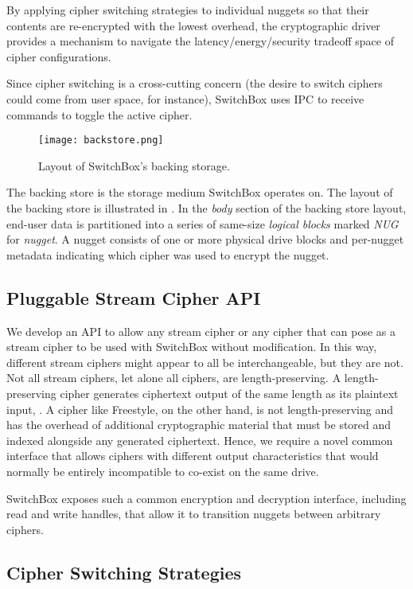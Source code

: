 By applying cipher switching strategies to individual nuggets so that their
contents are re-encrypted with the lowest overhead, the cryptographic driver
provides a mechanism to navigate the latency/energy/security tradeoff space of
cipher configurations.

Since cipher switching is a cross-cutting concern (the desire to switch ciphers
could come from user space, for instance), SwitchBox uses IPC to receive
commands to toggle the active cipher.

\begin{figure}[t]
\centering
\texttt{[image: backstore.png]}
 \caption{Layout of SwitchBox's backing storage.}\label{fig:backstore2}
\end{figure}

The backing store is the storage medium SwitchBox operates on. The layout of the
backing store is illustrated in . In the \textit{body}
section of the backing store layout, end-user data is partitioned into a series
of same-size \emph{logical blocks} marked \textit{NUG} for \emph{nugget}. A
nugget consists of one or more physical drive blocks and per-nugget metadata
indicating which cipher was used to encrypt the nugget.

\subsection{Pluggable Stream Cipher API}

We develop an API to allow any stream cipher or any cipher that can pose as a
stream cipher to be used with SwitchBox without modification. In this way,
different stream ciphers might appear to all be interchangeable, but they are
not. Not all stream ciphers, let alone all ciphers, are length-preserving. A
length-preserving cipher generates ciphertext output of the same length as its
plaintext input, . A cipher like Freestyle, on the other hand, is
not length-preserving and has the overhead of additional cryptographic material
that must be stored and indexed alongside any generated ciphertext. Hence, we
require a novel common interface that allows ciphers with different output
characteristics that would normally be entirely incompatible to co-exist on the
same drive.

SwitchBox exposes such a common encryption and decryption interface, including
read and write handles, that allow it to transition nuggets between arbitrary
ciphers.

\subsection{Cipher Switching Strategies}

